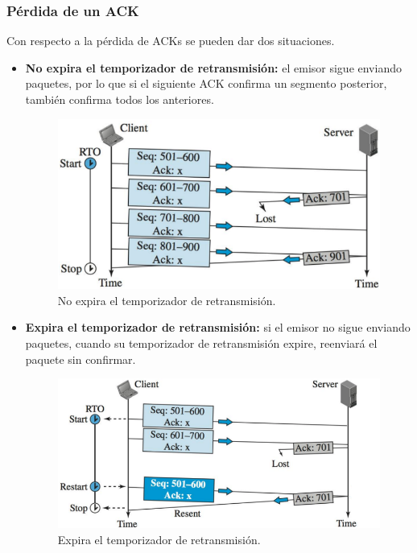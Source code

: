 \subsubsection{Pérdida de un ACK}
Con respecto a la pérdida de ACKs se pueden dar dos situaciones.
\begin{itemize}
    \item \textbf{No expira el temporizador de retransmisión:} el emisor sigue enviando paquetes, por lo que si el siguiente ACK confirma un segmento posterior, también confirma todos los anteriores.
        \begin{figure}[H]\centering
        \includegraphics[width=\textwidth]{img/TCPACK1.png}
        \caption{No expira el temporizador de retransmisión.}\end{figure}
    \item \textbf{Expira el temporizador de retransmisión:} si el emisor no sigue enviando paquetes, cuando su temporizador de retransmisión expire, reenviará el paquete sin confirmar.
        \begin{figure}[H] \centering
        \includegraphics[width=\textwidth]{img/TCPACK2.png}
        \caption{Expira el temporizador de retransmisión.}\end{figure}
\end{itemize}


